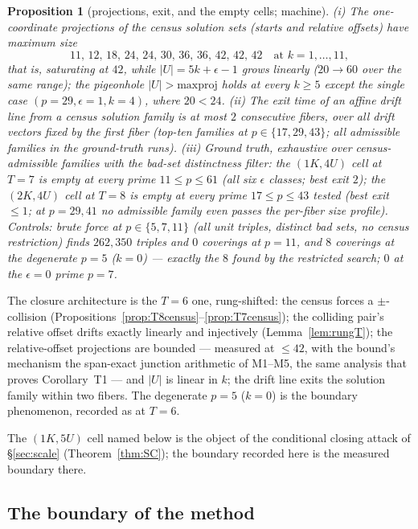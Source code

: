 \documentclass[11pt,a4paper]{article}
\numberwithin{equation}{section}
\theoremstyle{plain}
\newtheorem{proposition}[theorem]{Proposition}
\theoremstyle{definition}
\theoremstyle{remark}
\begin{document}
\begin{proposition}[projections, exit, and the empty cells; machine]
\label{prop:shearT78}
\textup{(i)} The one-coordinate projections of the census solution sets
(starts and relative offsets) have maximum size
\[
11,\,12,\,18,\,24,\,24,\,30,\,36,\,36,\,42,\,42,\,42
\quad\text{at }k=1,\dots,11,
\]
that is, \emph{saturating at $42$}, while
$|U|=5k+\epsilon-1$ grows linearly ($20\to60$ over the same range); the
pigeonhole $|U|>\text{maxproj}$ holds at every $k\ge5$ except the single
case $(p{=}29,\epsilon{=}1,k{=}4)$, where $20<24$. \textup{(ii)} The
exit time of an affine drift line from a census solution family is at
most $2$ consecutive fibers, over all drift vectors fixed by the first
fiber (top-ten families at $p\in\{17,29,43\}$; all admissible families
in the ground-truth runs). \textup{(iii)} Ground truth, exhaustive over
census-admissible families with the bad-set distinctness filter: the
$(1K,4U)$ cell at $T=7$ is \emph{empty} at every prime
$11\le p\le61$ (all six $\epsilon$ classes; best exit $2$); the
$(2K,4U)$ cell at $T=8$ is \emph{empty} at every prime $17\le p\le43$
tested (best exit $\le1$; at $p=29,41$ no admissible family even passes
the per-fiber size profile). Controls: brute force at $p\in\{5,7,11\}$
(all unit triples, distinct bad sets, no census restriction) finds
$262{,}350$ triples and $0$ coverings at $p=11$, and $8$ coverings at
the degenerate $p=5$ ($k=0$) --- exactly the $8$ found by the
restricted search; $0$ at the $\epsilon=0$ prime $p=7$.
\end{proposition}

The closure architecture is the $T=6$ one, rung-shifted: the census
forces a $\pm$-collision (Propositions~\ref{prop:T8census}--\ref{prop:T7census});
the colliding pair's relative offset drifts exactly linearly and
injectively (Lemma~\ref{lem:rungT}); the relative-offset projections are
bounded --- measured at $\le42$, with the bound's mechanism the
span-exact junction arithmetic of M1--M5, the same analysis that proves
Corollary~T1 --- and $|U|$ is linear in $k$; the drift line exits the
solution family within two fibers. The degenerate $p=5$ ($k=0$) is the
boundary phenomenon, recorded as at $T=6$.

The $(1K,5U)$ cell named below is the object of the conditional
closing attack of \S\ref{sec:scale} (Theorem~\ref{thm:SC}); the boundary
recorded here is the measured boundary there.

\subsection{The boundary of the method}
\end{document}

